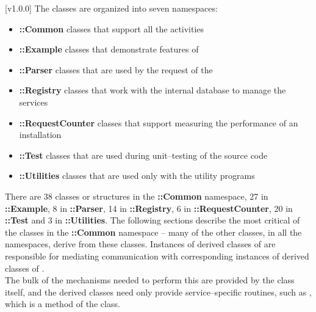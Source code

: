 [v1.0.0]
The \mplusm{} classes are organized into seven namespaces:
\begin{itemize}
\item \textbf{\mplusm{}::Common} classes that support all the \mplusm{} activities
\item \textbf{\mplusm{}::Example} classes that demonstrate features of \mplusm{}
\item \textbf{\mplusm{}::Parser} classes that are used by the
 request of the
\item \textbf{\mplusm{}::Registry} classes that work with the internal database to manage
the \mplusm{} services
\item \textbf{\mplusm{}::RequestCounter} classes that support measuring the performance
of an \mplusm{} installation
\item \textbf{\mplusm{}::Test} classes that are used during unit--testing of the \mplusm{}
source code
\item \textbf{\mplusm{}::Utilities} classes that are used only with the \mplusm{}
utility programs
\end{itemize}
There are 38 classes or structures in the \textbf{\mplusm{}::Common} namespace, 27 in
\textbf{\mplusm{}::Example}, 8 in \textbf{\mplusm{}::Parser}, 14 in
\textbf{\mplusm{}::Registry}, 6 in \textbf{\mplusm{}::RequestCounter}, 20 in
\textbf{\mplusm{}::Test} and 3 in \textbf{\mplusm{}::Utilities}.
The following sections describe the most critical of the classes in the
\textbf{\mplusm{}::Common} namespace -- many of the other classes, in all the namespaces,
derive from these classes. 
Instances of derived classes of  are responsible for
mediating \mplusm{} communication with corresponding instances of derived classes of
.\\

The bulk of the mechanisms needed to perform this are provided by the
 class itself, and the derived classes need only
provide service--specific routines, such as ,
which is a method of the  class.\\

